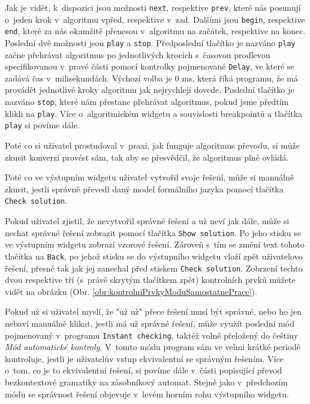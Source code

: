 Jak je vidět, k~dispozici jsou možnosti \texttt{next}, respektive \texttt{prev}, které nás posunují o~jeden krok v~algoritmu vpřed, respektive v~zad. Dalšími jsou \texttt{begin}, respektive \texttt{end}, které za nás okamžitě přenesou v~algoritmu na začátek, respektive na konec. Poslední dvě možnosti jsou \texttt{play} a \texttt{stop}. Předposlední tlačítko je nazváno \texttt{play} začne přehrávat algoritmus po jednotlivých krocích s~časovou prodlevou specifikovanou v~pravé části pomocí kontrolky pojmenované \texttt{Delay}, ve které se zadává čas v~milisekundách. Výchozí volba je 0 ms, která říká programu, že má provádět jednotlivé kroky algoritmu jak nejrychleji dovede. Poslední tlačítko je nazváno \texttt{stop}, které nám přestane přehrávat algoritmus, pokud jsme předtím klikli na \texttt{play}. Více o~algoritmickém widgetu a souvislosti breakpointů a tlačítka \texttt{play} si povíme dále.


Poté co si uživatel prostudoval v~praxi, jak funguje algoritmus převodu, si může zkusit konverzi provést sám, tak aby se přesvědčil, že algoritmus plně ovládá. 

Poté co ve výstupním widgetu uživatel vytvořil svoje řešení, může si manuálně zkusit, jestli správně převedl daný model formálního jazyka pomocí tlačítka \texttt{Check solution}. 

Pokud uživatel zjistil, že nevytvořil správné řešení a už neví jak dále, může si nechat správné řešení zobrazit pomocí tlačítka \texttt{Show solution}. Po jeho stisku se ve výstupním widgetu zobrazí vzorové řešení. Zároveň s~tím se změní text tohoto tlačítka na \texttt{Back}, po jehož stisku se do výstupního widgetu vloží zpět uživatelovo řešení, přesně tak jak jej zanechal před stiskem \texttt{Check solution}. Zobrzení techto dvou respektive tří (s~právě skrytým tlačítkem zpět) kontrolních prvků můžete vidět na obrázku (Obr. \ref{obr:kontrolniPrvkyModuSamostatnePrace}).



Pokud už si uživatel myslí, že "už už" přece řešení musí být správné, nebo ho jen nebaví manuálně klikat, jestli má už správné řešení, může využít poslední mód pojmenovaný v~programu \texttt{Instant checking}, taktéž volně přeložený do češtiny \textit{Mód automatické kontroly}. V~tomto módu program sám ve velmi krátké periodě kontroluje, jestli je uživatelův vstup ekvivalentní se správným řešením. Více o~tom, co je to ekvivalentní řešení, si povíme dále v~části popisující převod bezkontextové gramatiky na zásobníkový automat. Stejně jako v~předchozím módu se správnost řešení objevuje v~levém horním rohu výstupního widgetu. 

